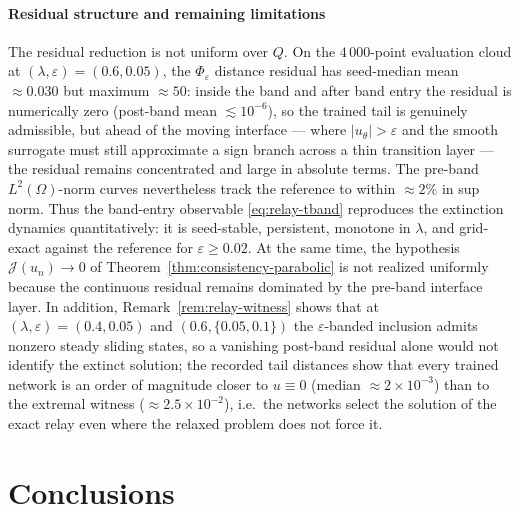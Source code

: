 \documentclass[11pt]{elsarticle}
\theoremstyle{definition}
\theoremstyle{remark}
\numberwithin{equation}{section}
\begin{document}
\paragraph{Residual structure and remaining limitations}
The residual reduction is not uniform over $Q$. On
the $4\,000$-point evaluation cloud at
$(\lambda,\varepsilon)=(0.6,0.05)$, the $\Phi_\varepsilon$ distance
residual has seed-median mean ${\approx}0.030$ but maximum
${\approx}50$: inside the band and after band entry the residual is
numerically zero (post-band mean $\lesssim10^{-6}$), so the trained tail
is genuinely admissible, but ahead of the moving interface --- where
$|u_\theta|>\varepsilon$ and the smooth surrogate must still approximate
a sign branch across a thin transition layer --- the residual remains
concentrated and large in absolute terms. The pre-band
$L^2(\Omega)$-norm curves nevertheless track the reference to within
${\approx}2\%$ in sup norm. Thus the band-entry observable
\eqref{eq:relay-tband} reproduces the extinction dynamics quantitatively:
it is seed-stable, persistent, monotone in $\lambda$, and grid-exact against
the reference for $\varepsilon\ge0.02$. At the same time, the hypothesis
$\mathcal{J}(u_n)\to0$ of Theorem~\ref{thm:consistency-parabolic} is not
realized uniformly because the continuous residual remains dominated by
the pre-band interface layer. In addition, Remark~\ref{rem:relay-witness}
shows that at $(\lambda,\varepsilon)=(0.4,0.05)$ and
$(0.6,\{0.05,0.1\})$ the $\varepsilon$-banded inclusion admits nonzero
steady sliding states, so a vanishing post-band residual alone would not
identify the extinct solution; the recorded tail distances show that
every trained network is an order of magnitude closer to $u\equiv0$
(median ${\approx}2\times10^{-3}$) than to the extremal witness
(${\approx}2.5\times10^{-2}$), i.e.\ the networks select the solution of
the exact relay even where the relaxed problem does not force it.


\section{Conclusions}
\label{sec:conclusions}
\end{document}
